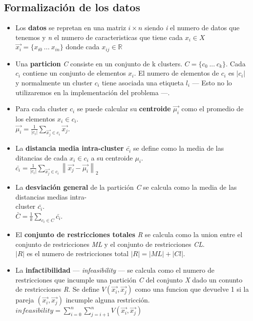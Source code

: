 \subsection{Formalización de los datos}
\begin{itemize}
   \item Los \textbf{datos} se repretan en una matriz $ i \times n $ siendo \emph{i} el numero de datos que tenemos y \emph{n} el numero de caracteristicas que tiene cada $ x_{i} \in X $ \\
   $ \vec{x_{i}} = \{x_{i0}\ ...\ x_{in}\} $ donde cada $ x_{ij} \in \mathbb{R} $
   \item Una \textbf{particion} \emph{C} consiste en un conjunto de k clusters. $ C = \{c_{0}\ ...\ c_{k}\} $. Cada $ c_{i} $ contiene un conjunto de elementos $ x_{i} $. El numero de elementos de $ c_{i} $ es $ \left | c_{i} \right | $ y normalmente un cluster $ c_{i} $ tiene asociada una etiqueta $ l_{i} $ --- Esto no lo utilizaremos en la implementación del problema ---.
   \item Para cada cluster $ c_{i} $ se puede calcular su \textbf{centroide} $ \vec{\mu_{i}} $ como el promedio de los elementos $ x_{i} \in c_{i} $.\\
   $ \vec{\mu_{i}} = \frac{1}{\left | c_{i} \right |}\sum_{\vec{x_{j}} \in c_{i}} \vec{x_{j}} $.
   \item La \textbf{distancia media intra-cluster} $ \bar{c_{i}} $ se define como la media de las ditancias de cada $ x_{i} \in c_{i} $ a su centroide $ \mu_{i} $.\\
   $ \bar{c_{i}} = \frac{1}{\left | c_{i} \right |}\sum_{\vec{x_{j}} \in c_{i}} \left \| \vec{x_{j}} - \vec{\mu_{i}} \right \|_{2} $
   \item La \textbf{desviación general} de la partición \emph{C} se calcula como la media de las distancias medias intra-\\cluster $ \bar{c_{i}} $.\\
   $ \bar{C} = \frac{1}{k}\sum_{c_{i} \in C} \bar{c_i} $.
   \item El \textbf{conjunto de restricciones totales} \emph{R} se calcula como la union entre el conjunto de restricciones \emph{ML} y el conjunto de restricciones \emph{CL}.\\
   $ \left | R \right | $ es el numero de restricciones total $ \left | R \right | = \left | ML \right | + \left | Cl \right | $.
   \item La \textbf{infactibilidad} --- \emph{infeasibility} --- se calcula como el numero de restricciones que incumple una partición \emph{C} del conjunto \emph{X} dado un conunto de restricciones \emph{R}. Se define $ V(\vec{x_{i}},\vec{x_{j}}) $ como una funcion que devuelve 1 si la pareja $ (\vec{x_{i}},\vec{x_{j}}) $ incumple alguna restricción.\\
   $ infeasibility = \sum_{i=0}^{n} \sum_{j=i+1}^{n} V(\vec{x_{i}},\vec{x_{j}}) $
\end{itemize}
\newpage
